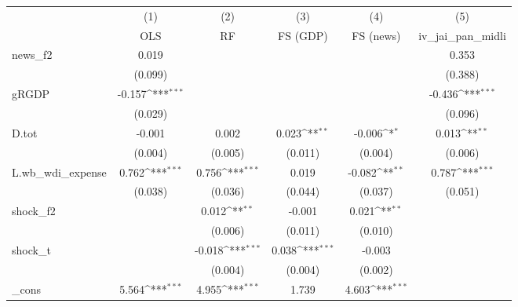 {
\def\sym#1{\ifmmode^{#1}\else\(^{#1}\)\fi}
\begin{tabular}{l*{5}{c}}
\toprule
            &\multicolumn{1}{c}{(1)}&\multicolumn{1}{c}{(2)}&\multicolumn{1}{c}{(3)}&\multicolumn{1}{c}{(4)}&\multicolumn{1}{c}{(5)}\\
            &\multicolumn{1}{c}{OLS}&\multicolumn{1}{c}{RF}&\multicolumn{1}{c}{FS (GDP)}&\multicolumn{1}{c}{FS (news)}&\multicolumn{1}{c}{iv\_jai\_pan\_midli}\\
\midrule
news\_f2     &       0.019         &                     &                     &                     &       0.353         \\
            &     (0.099)         &                     &                     &                     &     (0.388)         \\
\addlinespace
gRGDP       &      -0.157\sym{***}&                     &                     &                     &      -0.436\sym{***}\\
            &     (0.029)         &                     &                     &                     &     (0.096)         \\
\addlinespace
D.tot       &      -0.001         &       0.002         &       0.023\sym{**} &      -0.006\sym{*}  &       0.013\sym{**} \\
            &     (0.004)         &     (0.005)         &     (0.011)         &     (0.004)         &     (0.006)         \\
\addlinespace
L.wb\_wdi\_expense&       0.762\sym{***}&       0.756\sym{***}&       0.019         &      -0.082\sym{**} &       0.787\sym{***}\\
            &     (0.038)         &     (0.036)         &     (0.044)         &     (0.037)         &     (0.051)         \\
\addlinespace
shock\_f2    &                     &       0.012\sym{**} &      -0.001         &       0.021\sym{**} &                     \\
            &                     &     (0.006)         &     (0.011)         &     (0.010)         &                     \\
\addlinespace
shock\_t     &                     &      -0.018\sym{***}&       0.038\sym{***}&      -0.003         &                     \\
            &                     &     (0.004)         &     (0.004)         &     (0.002)         &                     \\
\addlinespace
\_cons      &       5.564\sym{***}&       4.955\sym{***}&       1.739         &       4.603\sym{***}&                     \\

\end{tabular}}
